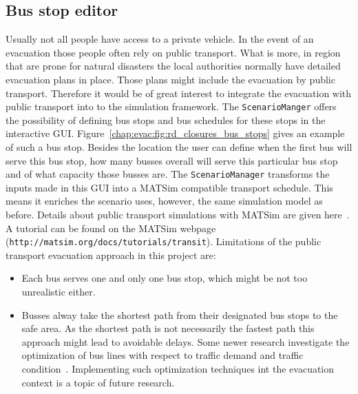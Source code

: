 \subsection{Bus stop editor}
Usually not all people have access to a private vehicle. In the event of an evacuation those people often rely on public transport. What is more, in region that are prone for natural disasters the local authorities normally have detailed evacuation plans in place. Those plans might include the evacuation by public transport. Therefore it would be of great interest to integrate the evacuation with public transport into to the simulation framework. The \verb+ScenarioManger+ offers the possibility of defining bus stops and bus schedules for these stops in the interactive GUI. Figure~\ref{chap:evac:fig:rd_closures_bus_stops} gives an example of such a bus stop. Besides the location the user can define when the first bus will serve this bus stop, how many busses overall will serve this particular bus stop and of what capacity those busses are. The \verb+ScenarioManager+ transforms the inputs made in this GUI into a MATSim compatible transport schedule. This means it enriches the scenario uses, however, the same simulation model as before. Details about public transport simulations with MATSim are given here~\citet{TODO}. A tutorial can be found on the MATSim webpage (\verb+http://matsim.org/docs/tutorials/transit+).
Limitations of the public transport evacuation approach in this project are:
\begin{itemize}
\item Each bus serves one and only one bus stop, which might be not too unrealistic either.  
\item Busses alway take the shortest path from their designated bus stops to the safe area. As the shortest path is not necessarily the fastest path this approach might lead to avoidable delays. Some newer research investigate the optimization of bus lines with respect to traffic demand and traffic condition~\citep{Neumann_PhDThesis_2014}. Implementing such optimization techniques int the evacuation context is a topic of future research.
\end{itemize}

